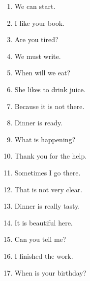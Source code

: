 \documentclass{article}
\begin{document}
\begin{enumerate}
    \item We can start.  
    \item I like your book.  
    \item Are you tired?  
    \item We must write.  
    \item When will we eat?  
    \item She likes to drink juice.  
    \item Because it is not there.  
    \item Dinner is ready.  
    \item What is happening?  
    \item Thank you for the help.  
    \item Sometimes I go there.  
    \item That is not very clear.  
    \item Dinner is really tasty.  
    \item It is beautiful here.  
    \item Can you tell me?  
    \item I finished the work.  
    \item When is your birthday?  
\end{enumerate}
\end{document}
